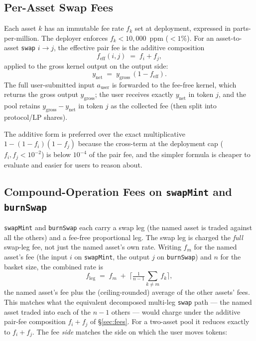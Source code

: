 \documentclass[11pt]{article}
\begin{document}
\subsection{Per-Asset Swap Fees}

Each asset $k$ has an immutable fee rate $f_k$ set at deployment,
expressed in parts-per-million. The deployer enforces $f_k <
10{,}000$~ppm ($< 1\%$). For an asset-to-asset \texttt{swap} $i \to
j$, the effective pair fee is the additive composition
\begin{equation}
  f_{\mathrm{eff}}(i, j) \;=\; f_i + f_j,
\end{equation}
applied to the gross kernel output on the output side:
\[
  y_{\mathrm{net}} \;=\; y_{\mathrm{gross}}\,(1 - f_{\mathrm{eff}}).
\]
The full user-submitted input $a_{\mathrm{user}}$ is forwarded to the
fee-free kernel, which returns the gross output $y_{\mathrm{gross}}$;
the user receives exactly $y_{\mathrm{net}}$ in token $j$, and the pool
retains $y_{\mathrm{gross}} - y_{\mathrm{net}}$ in token $j$ as the
collected fee (then split into protocol/LP shares).

The additive form is preferred over the exact multiplicative
$1 - (1 - f_i)(1 - f_j)$ because the cross-term at the deployment cap
($f_i, f_j < 10^{-2}$) is below $10^{-4}$ of the pair fee, and the
simpler formula is cheaper to evaluate and easier for users to reason
about.

\subsection{Compound-Operation Fees on \texttt{swapMint} and \texttt{burnSwap}}

\texttt{swapMint} and \texttt{burnSwap} each carry a swap leg (the
named asset is traded against all the others) and a fee-free
proportional leg. The swap leg is charged the \emph{full} swap-leg
fee, not just the named asset's own rate. Writing $f_m$ for the named
asset's fee (the input $i$ on \texttt{swapMint}, the output $j$ on
\texttt{burnSwap}) and $n$ for the basket size, the combined rate is
\begin{equation}
  f_{\mathrm{leg}}
  \;=\; f_m \;+\;
  \Big\lceil \tfrac{1}{n-1}\textstyle\sum_{k \ne m} f_k \Big\rceil,
\end{equation}
the named asset's fee plus the (ceiling-rounded) average of the other
assets' fees. This matches what the equivalent decomposed multi-leg
\texttt{swap} path --- the named asset traded into each of the $n-1$
others --- would charge under the additive pair-fee composition
$f_i + f_j$ of \S\ref{sec:fees}. For a two-asset pool it reduces
exactly to $f_i + f_j$. The fee \emph{side} matches the side on which
the user moves tokens:
\end{document}
